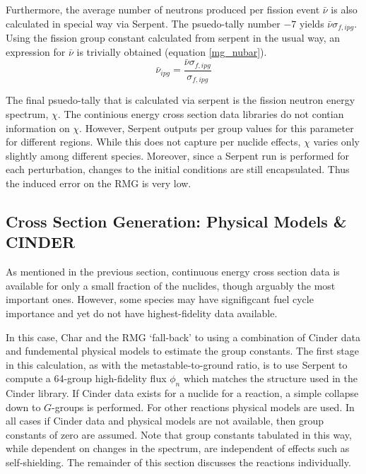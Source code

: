 Furthermore, the average number of neutrons produced per fission event $\bar{\nu}$ is also 
calculated in special way via Serpent.  The psuedo-tally number $-7$ yields $\bar{\nu}\sigma_{f,ipg}$.
Using the fission group constant calculated from serpent in the usual way, an expression for $\bar{\nu}$
is trivially obtained (equation \ref{mg_nubar}).
\begin{equation}
\label{mg_nubar}
\bar{\nu}_{ipg} = \frac{\bar{\nu}\sigma_{f,ipg}}{\sigma_{f,ipg}}
\end{equation}

The final psuedo-tally that is calculated via serpent is the fission neutron energy spectrum, $\chi$.
The continious energy cross section data libraries do not contian information on $\chi$.  However, 
Serpent outputs per group values for this parameter for different regions.  While this does not 
capture per nuclide effects, $\chi$ varies only slightly among different species.  
Moreover, since a Serpent run is performed for each perturbation, changes to 
the initial conditions are still encapsulated.  Thus the induced error on the RMG is very low.


\subsection{Cross Section Generation: Physical Models \& CINDER}
As mentioned in the previous section, continuous energy cross section data is available for only 
a small fraction of the nuclides, though arguably the most important ones.  However, some species 
may have signifigcant fuel cycle importance and yet do not have highest-fidelity data available.

In this case, Char and the RMG `fall-back' to using a combination of Cinder data and fundemental 
physical models to estimate the group constants. The first stage in this calculation, as with the 
metastable-to-ground ratio, is to use Serpent to compute a 64-group high-fidelity flux $\phi_n$
which matches the structure used in the Cinder library.  If Cinder data exists for a nuclide for 
a reaction, a simple collapse down to $G$-groups is performed.  For other reactions physical
models are used.  In all cases if Cinder data and physical models are not available, then group
constants of zero are assumed.  Note that group constants tabulated in this way, while dependent 
on changes in the spectrum, are independent of effects such as self-shielding.
The remainder of this section discusses the reactions individually.

